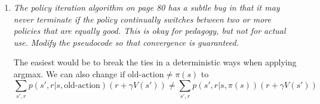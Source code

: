 \documentclass[12pt,a4paper]{article}
\begin{document}
\begin{enumerate}
  \item
    \textit{The policy iteration algorithm on page 80 has a subtle bug in that it may
    never terminate if the policy continually switches between two or more policies that are
    equally good. This is okay for pedagogy, but not for actual use. Modify the pseudocode
    so that convergence is guaranteed.}

    The easiest would be to break the ties in a deterministic ways when applying argmax.
    We can also change $\text{if old-action} \neq \pi(s)$ to
    \[
    \sum\limits_{s', r} p(s', r | s, \text{old-action}) (r + \gamma V(s')) \neq
    \sum\limits_{s', r} p(s', r | s, \pi(s)) (r + \gamma V(s'))
    \]

\end{enumerate}
\end{document}
